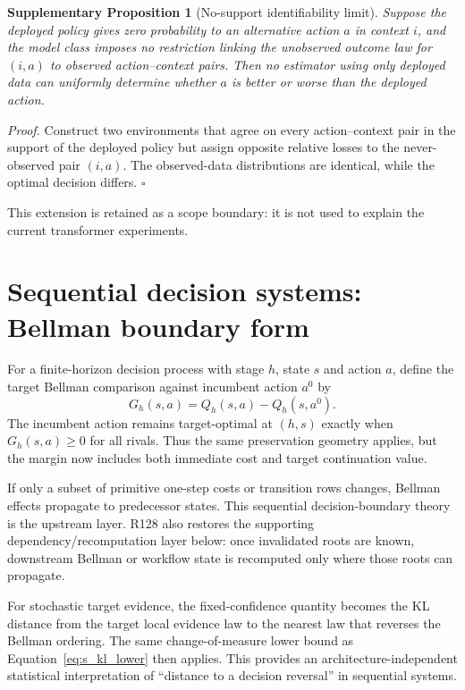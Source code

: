 \documentclass[11pt,letterpaper]{article}
\theoremstyle{plain}
\newtheorem{proposition}{Supplementary Proposition}
\newcommand{\1}{\mathbf 1}
\begin{document}
\begin{proposition}[No-support identifiability limit]
Suppose the deployed policy gives zero probability to an alternative action $a$ in context $i$, and the model class imposes no restriction linking the unobserved outcome law for $(i,a)$ to observed action--context pairs. Then no estimator using only deployed data can uniformly determine whether $a$ is better or worse than the deployed action.
\end{proposition}
\textit{Proof.} Construct two environments that agree on every action--context pair in the support of the deployed policy but assign opposite relative losses to the never-observed pair $(i,a)$. The observed-data distributions are identical, while the optimal decision differs. $\square$

This extension is retained as a scope boundary: it is not used to explain the current transformer experiments.

\section{Sequential decision systems: Bellman boundary form}
For a finite-horizon decision process with stage $h$, state $s$ and action $a$, define the target Bellman comparison against incumbent action $a^0$ by
\begin{equation}
 G_h(s,a)=Q_h(s,a)-Q_h(s,a^0).
\label{eq:s_bellman_gap}
\end{equation}
The incumbent action remains target-optimal at $(h,s)$ exactly when $G_h(s,a)\ge0$ for all rivals. Thus the same preservation geometry applies, but the margin now includes both immediate cost and target continuation value.

If only a subset of primitive one-step costs or transition rows changes, Bellman effects propagate to predecessor states. This sequential decision-boundary theory is the upstream layer. R128 also restores the supporting dependency/recomputation layer below: once invalidated roots are known, downstream Bellman or workflow state is recomputed only where those roots can propagate.

For stochastic target evidence, the fixed-confidence quantity becomes the KL distance from the target local evidence law to the nearest law that reverses the Bellman ordering. The same change-of-measure lower bound as Equation~\ref{eq:s_kl_lower} then applies. This provides an architecture-independent statistical interpretation of ``distance to a decision reversal'' in sequential systems.
\end{document}
